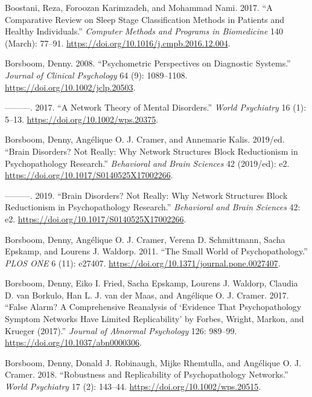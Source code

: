 \documentclass[
  a4paper,
  DIV=11,
  numbers=noendperiod]{scrreprt}
\newlength{\cslhangindent}
\newlength{\cslentryspacingunit} %
\newenvironment{CSLReferences}[2] %
 {%
  \setlength{\parindent}{0pt}
  \ifodd #1
  \let\oldpar\par
  \def\par{\hangindent=\cslhangindent\oldpar}
  \fi
  \setlength{\parskip}{#2\cslentryspacingunit}
 }%
 {}
\begin{document}
\begin{CSLReferences}{1}{0}
\leavevmode{}%
Boostani, Reza, Foroozan Karimzadeh, and Mohammad Nami. 2017. {``A
Comparative Review on Sleep Stage Classification Methods in Patients and
Healthy Individuals.''} \emph{Computer Methods and Programs in
Biomedicine} 140 (March): 77--91.
\url{https://doi.org/10.1016/j.cmpb.2016.12.004}.

\leavevmode{}%
Borsboom, Denny. 2008. {``Psychometric Perspectives on Diagnostic
Systems.''} \emph{Journal of Clinical Psychology} 64 (9): 1089--1108.
\url{https://doi.org/10.1002/jclp.20503}.

\leavevmode{}%
---------. 2017. {``A Network Theory of Mental Disorders.''} \emph{World
Psychiatry} 16 (1): 5--13. \url{https://doi.org/10.1002/wps.20375}.

\leavevmode{}%
Borsboom, Denny, Angélique O. J. Cramer, and Annemarie Kalis. 2019/ed.
{``Brain Disorders? {Not} Really: {Why} Network Structures Block
Reductionism in Psychopathology Research.''} \emph{Behavioral and Brain
Sciences} 42 (2019/ed): e2.
\url{https://doi.org/10.1017/S0140525X17002266}.

\leavevmode{}%
---------. 2019. {``Brain Disorders? Not Really: Why Network Structures
Block Reductionism in Psychopathology Research.''} \emph{Behavioral and
Brain Sciences} 42: e2. \url{https://doi.org/10.1017/S0140525X17002266}.

\leavevmode{}%
Borsboom, Denny, Angélique O. J. Cramer, Verena D. Schmittmann, Sacha
Epskamp, and Lourens J. Waldorp. 2011. {``The {Small World} of
{Psychopathology}.''} \emph{PLOS ONE} 6 (11): e27407.
\url{https://doi.org/10.1371/journal.pone.0027407}.

\leavevmode{}%
Borsboom, Denny, Eiko I. Fried, Sacha Epskamp, Lourens J. Waldorp,
Claudia D. van Borkulo, Han L. J. van der Maas, and Angélique O. J.
Cramer. 2017. {``False Alarm? {A} Comprehensive Reanalysis of
{`{Evidence} That Psychopathology Symptom Networks Have Limited
Replicability'} by {Forbes}, {Wright}, {Markon}, and {Krueger}
(2017).''} \emph{Journal of Abnormal Psychology} 126: 989--99.
\url{https://doi.org/10.1037/abn0000306}.

\leavevmode{}%
Borsboom, Denny, Donald J. Robinaugh, Mijke Rhemtulla, and Angélique O.
J. Cramer. 2018. {``Robustness and Replicability of Psychopathology
Networks.''} \emph{World Psychiatry} 17 (2): 143--44.
\url{https://doi.org/10.1002/wps.20515}.


\end{CSLReferences}
\end{document}
